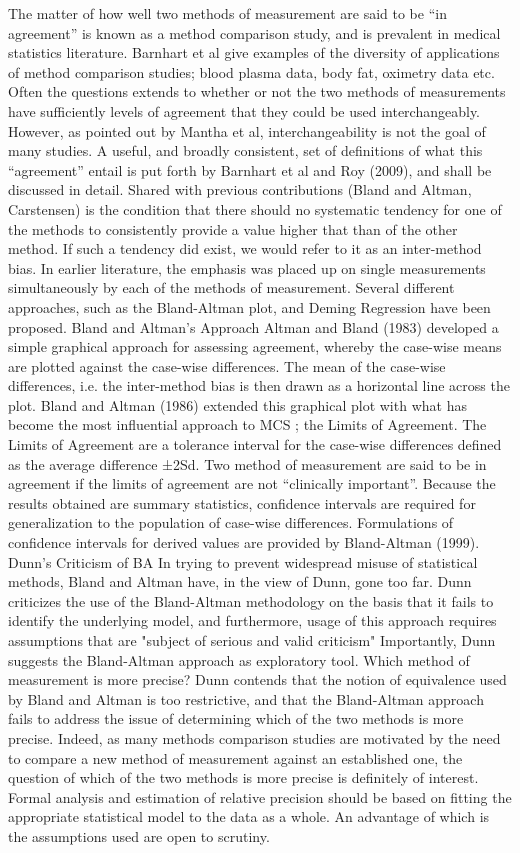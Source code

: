 The matter of how well two methods of measurement are said to be “in agreement” is known as a method comparison study, and is prevalent in medical statistics literature.  Barnhart et al give examples of the diversity of applications of method comparison studies; blood plasma data, body fat, oximetry data etc. 
Often the questions extends to whether or not the two methods of measurements have sufficiently levels of agreement that they could be used interchangeably. However, as pointed out by Mantha et al, interchangeability is not the goal of many studies.
A useful, and broadly consistent, set of definitions of what this “agreement” entail is put forth by Barnhart et al and Roy (2009), and shall be discussed in detail.
Shared with previous contributions (Bland and Altman, Carstensen) is the condition that there should no systematic tendency for one of the methods to consistently provide a value higher that than of the other method. If such a tendency did exist, we would refer to it as an inter-method bias.
In earlier literature, the emphasis was placed up on single measurements simultaneously by each of the methods of measurement. Several different approaches, such as the Bland-Altman plot, and Deming Regression have been proposed. 
Bland  and Altman’s Approach
Altman and Bland (1983) developed a simple graphical approach for assessing agreement,  whereby the case-wise means are plotted against the case-wise differences. The mean of the case-wise differences, i.e. the inter-method bias is then drawn as a horizontal line across the plot. 
Bland and Altman (1986) extended this graphical plot with what has become the most influential approach to MCS ; the Limits of Agreement. The Limits of Agreement are a tolerance interval for the case-wise differences defined as the average difference ±2Sd. Two method of measurement are said to be in agreement if the limits of agreement are not “clinically important”.
Because the results obtained are summary statistics, confidence intervals are required for generalization to the population of case-wise differences. Formulations of confidence intervals for derived values are provided by Bland-Altman (1999).
Dunn’s Criticism of BA
In trying to prevent widespread misuse of statistical methods, Bland and Altman have, in the view of Dunn, gone too far.
Dunn criticizes the use of the Bland-Altman methodology on the basis that it fails to identify the underlying model, and furthermore, usage of this approach requires assumptions that are "subject of serious and valid criticism"
Importantly, Dunn suggests the Bland-Altman approach as exploratory tool.
Which method of measurement is more precise?
Dunn contends that the notion of equivalence used by Bland and Altman is too restrictive, and that the Bland-Altman approach fails to address the issue of determining which of the two methods is more precise. Indeed, as many methods comparison studies are motivated by the need to compare a new method of measurement against an established one, the question of which of the two methods is more precise is definitely of interest.
Formal analysis and estimation of relative precision should be based on fitting the appropriate statistical model to the data as a whole. An advantage of which is the assumptions used are open to scrutiny.


